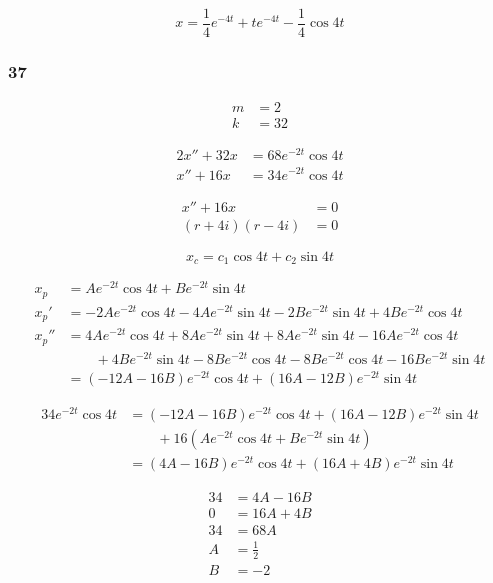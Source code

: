 \documentclass{article}
\begin{document}
\[x = \frac{1}{4} e^{-4t} + t e^{-4t} - \frac{1}{4} \cos 4t\]

\subsubsection{37}

\begin{align*}
  m & = 2  \\
  k & = 32
\end{align*}

\begin{align*}
  2 x'' + 32 x & = 68 e^{-2t} \cos 4t \\
  x'' + 16 x   & = 34 e^{-2t} \cos 4t
\end{align*}

\begin{align*}
  x'' + 16 x        & = 0 \\
  (r + 4i) (r - 4i) & = 0
\end{align*}

\[x_c = c_1 \cos 4t + c_2 \sin 4t\]

\begin{align*}
  x_p   & = A e^{-2t} \cos 4t + B e^{-2t} \sin 4t                                                         \\
  x_p'  & = -2 A e^{-2t} \cos 4t - 4 A e^{-2t} \sin 4t - 2 B e^{-2t} \sin 4t + 4 B e^{-2t} \cos 4t        \\
  x_p'' & = 4 A e^{-2t} \cos 4t + 8 A e^{-2t} \sin 4t + 8 A e^{-2t} \sin 4t - 16 A e^{-2t} \cos 4t        \\
        & \qquad + 4 B e^{-2t} \sin 4t - 8 B e^{-2t} \cos 4t - 8 B e^{-2t} \cos 4t - 16 B e^{-2t} \sin 4t \\
        & = (-12A - 16B) e^{-2t} \cos 4t + (16A - 12B) e^{-2t} \sin 4t
\end{align*}

\begin{align*}
  34 e^{-2t} \cos 4t & = (-12A - 16B) e^{-2t} \cos 4t + (16A - 12B) e^{-2t} \sin 4t \\
                     & \qquad + 16 (A e^{-2t} \cos 4t + B e^{-2t} \sin 4t)          \\
                     & = (4A - 16B) e^{-2t} \cos 4t + (16A + 4B) e^{-2t} \sin 4t
\end{align*}

\begin{align*}
  34 & = 4A - 16B    \\
  0  & = 16A + 4B    \\
  34 & = 68A         \\
  A  & = \frac{1}{2} \\
  B  & = -2
\end{align*}
\end{document}

